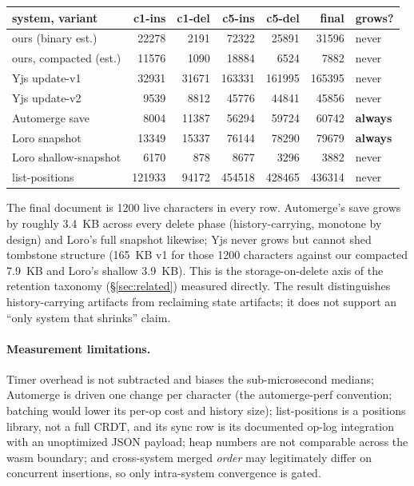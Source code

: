 \documentclass[11pt]{article}
\begin{document}
\begin{center}\small
\setlength{\tabcolsep}{4.5pt}
\begin{tabular}{@{}lrrrrrl@{}}
\toprule
system, variant & c1-ins & c1-del & c5-ins & c5-del & final & grows? \\
\midrule
ours (binary est.) & 22278 & 2191 & 72322 & 25891 & 31596 & never \\
ours, compacted (est.) & 11576 & 1090 & 18884 & 6524 & 7882 & never \\
Yjs update-v1 & 32931 & 31671 & 163331 & 161995 & 165395 & never \\
Yjs update-v2 & 9539 & 8812 & 45776 & 44841 & 45856 & never \\
Automerge save & 8004 & 11387 & 56294 & 59724 & 60742 & \textbf{always} \\
Loro snapshot & 13349 & 15337 & 76144 & 78290 & 79679 & \textbf{always} \\
Loro shallow-snapshot & 6170 & 878 & 8677 & 3296 & 3882 & never \\
list-positions & 121933 & 94172 & 454518 & 428465 & 436314 & never \\
\bottomrule
\end{tabular}
\end{center}

\noindent The final document is 1200 live characters in every row.
Automerge's save grows by roughly 3.4~KB across every delete phase
(history-carrying, monotone by design) and Loro's full snapshot likewise;
Yjs never grows but cannot shed tombstone structure (165~KB v1 for those
1200 characters against our compacted 7.9~KB and Loro's shallow 3.9~KB).
This is the storage-on-delete axis of the retention taxonomy
(\S\ref{sec:related}) measured directly. The result distinguishes
history-carrying artifacts from reclaiming state artifacts; it does not support
an ``only system that shrinks'' claim.

\paragraph{Measurement limitations.} Timer overhead
is not subtracted and biases the sub-microsecond medians; Automerge is
driven one change per character (the automerge-perf convention; batching
would lower its per-op cost and history size); list-positions is a
positions library, not a full CRDT, and its sync row is its documented
op-log integration with an unoptimized JSON payload; heap numbers are not
comparable across the wasm boundary; and cross-system merged \emph{order}
may legitimately differ on concurrent insertions, so only intra-system
convergence is gated.
\end{document}
